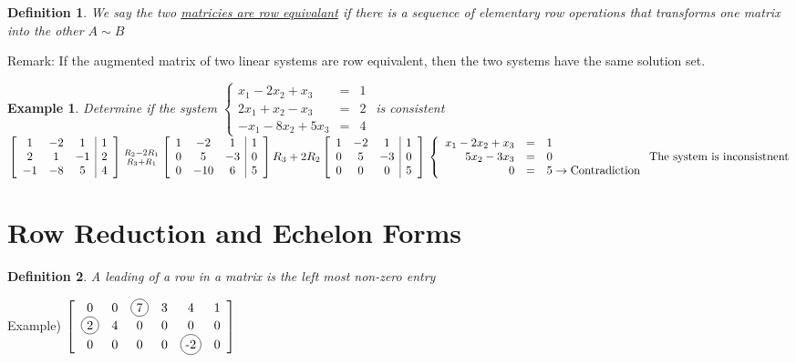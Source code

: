 \documentclass[a4paper,12pt,openany]{book}
\newcommand*{\bfrac}[2]{\genfrac{}{}{0pt}{}{#1}{#2}}
\newcommand*\circled[1]{\tikz[baseline=(char.base)]{
            \node[shape=circle,draw,inner sep=2pt] (char) {#1};}}
\theoremstyle{defn}
\newtheorem{defn}{Definition}[section]
\theoremstyle{expl}
\newtheorem{expl}{Example}[section]
\begin{document}
\begin{defn}
\textup{We say the two \underline{matricies are row equivalant} if there is a sequence of elementary row operations that transforms one matrix into the other $A\sim B$}\end{defn}
Remark: If the augmented matrix of two linear systems are row equivalent, then the two systems have the same solution set.
\begin{expl}
\textup{Determine if the system $\left\{\begin{array}{rcc}x_1-2x_2+x_3&=&1\\2x_1+x_2-x_3&=&2\\-x_1-8x_2+5x_3&=&4\end{array} \right.$ is consistent}\\
$\left[\begin{array}{ccc|c}
1&-2&1&1\\
2&1&-1&2\\
-1&-8&5&4
\end{array}\right]\bfrac{R_2-2R_1}{R_3+R_1}
\left[\begin{array}{ccc|c}
1&-2&1&1\\
0&5&-3&0\\
0&-10&6&5
\end{array}\right]R_3+2R_2
\left[\begin{array}{ccc|c}
1&-2&1&1\\
0&5&-3&0\\
0&0&0&5
\end{array}\right]\\
\left\{\begin{array}{rcl}
x_1-2x_2+x_3&=&1\\
5x_2-3x_3&=&0\\
0&=&5\rightarrow\textup{Contradiction}
\end{array}\right.\textup{The system is inconsistnent}
$\end{expl} 
\section{Row Reduction and Echelon Forms}
\begin{defn}\textup{A leading  of a row in a matrix is the left most non-zero entry} \end{defn}
Example) $\left[ \begin{array}{cccccc} 0 & 0 & \circled{7} & 3 & 4 & 1\\ \circled{2} & 4 & 0 &0 &0 &0 \\ 0 &0 &0 &0 &\circled{-2} &0 \end{array} \right] $
\end{document}
